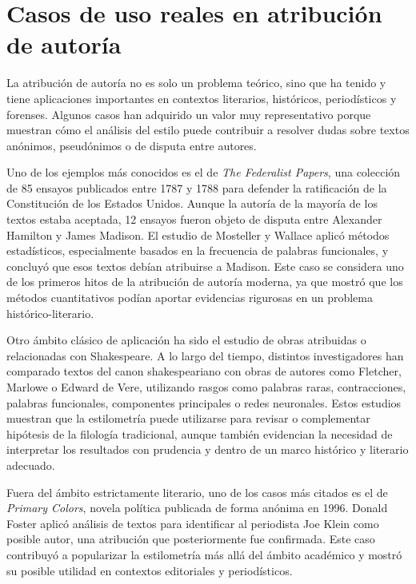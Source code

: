 \documentclass[IB]{TFUOC}%
\begin{document}
\section{Casos de uso reales en atribución de autoría}

La atribución de autoría no es solo un problema teórico, sino que ha tenido y tiene aplicaciones importantes en contextos literarios, históricos, periodísticos y forenses. Algunos casos han adquirido un valor muy representativo porque muestran cómo el análisis del estilo puede contribuir a resolver dudas sobre textos anónimos, pseudónimos o de disputa entre autores.

Uno de los ejemplos más conocidos es el de \textit{The Federalist Papers}, una colección de 85 ensayos publicados entre 1787 y 1788 para defender la ratificación de la Constitución de los Estados Unidos. Aunque la autoría de la mayoría de los textos estaba aceptada, 12 ensayos fueron objeto de disputa entre Alexander Hamilton y James Madison. El estudio de Mosteller y Wallace aplicó métodos estadísticos, especialmente basados en la frecuencia de palabras funcionales, y concluyó que esos textos debían atribuirse a Madison\cite{mosteller1963inference}. Este caso se considera uno de los primeros hitos de la atribución de autoría moderna, ya que mostró que los métodos cuantitativos podían aportar evidencias rigurosas en un problema histórico-literario.

Otro ámbito clásico de aplicación ha sido el estudio de obras atribuidas o relacionadas con Shakespeare. A lo largo del tiempo, distintos investigadores han comparado textos del canon shakespeariano con obras de autores como Fletcher, Marlowe o Edward de Vere, utilizando rasgos como palabras raras, contracciones, palabras funcionales, componentes principales o redes neuronales\cite{matthews1993neural}. Estos estudios muestran que la estilometría puede utilizarse para revisar o complementar hipótesis de la filología tradicional, aunque también evidencian la necesidad de interpretar los resultados con prudencia y dentro de un marco histórico y literario adecuado.

Fuera del ámbito estrictamente literario, uno de los casos más citados es el de \textit{Primary Colors}, novela política publicada de forma anónima en 1996. Donald Foster aplicó análisis de textos para identificar al periodista Joe Klein como posible autor, una atribución que posteriormente fue confirmada\cite{foster2000authorunknown}. Este caso contribuyó a popularizar la estilometría más allá del ámbito académico y mostró su posible utilidad en contextos editoriales y periodísticos.
\end{document}

